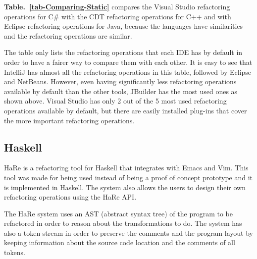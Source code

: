 {\bf Table.~\ref{tab-Comparing-Static}} compares the Visual Studio refactoring operations for C\#  with the CDT refactoring operations for C++ and with Eclipse refactoring operations for Java, because the languages have similarities and the refactoring operations are similar.

The table only lists the refactoring operations that each IDE has by default in order to have a fairer way to compare them with each other.
It is easy to see that IntelliJ has almost all the refactoring operations in this table, followed by Eclipse and NetBeans.
However, even having significantly less refactoring operations available by default than the other tools, JBuilder\cite{armstrong1998jbuilder} has the most used ones as shown above.
Visual Studio has only 2 out of the 5 most used refactoring operations available by default, but there are easily installed plug-ins that cover the more important refactoring operations. 



\subsection{Haskell}

HaRe \cite{thompson2005refactoring} is a refactoring tool for Haskell that integrates with Emacs and Vim.
This tool was made for being used instead of being a proof of concept prototype and it is implemented in Haskell.
The system also allows the users to design their own refactoring operations using the HaRe API.

The HaRe system uses an AST (abstract syntax tree) of the program to be refactored in order to reason about the transformations to do.
The system has also a token stream in order to preserve the comments and the program layout by keeping information about the source code location and the comments of all tokens.


